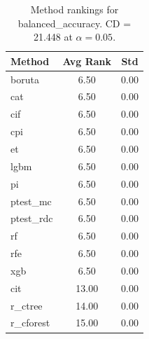 \begin{table}[h]
\centering
\caption{Method rankings for balanced_accuracy. CD = 21.448 at $\alpha=0.05$.}
\label{tab:ranks_balanced_accuracy}
\begin{tabular}{lcc}
\toprule
Method & Avg Rank & Std \\
\midrule
boruta & 6.50 & 0.00 \\
cat & 6.50 & 0.00 \\
cif & 6.50 & 0.00 \\
cpi & 6.50 & 0.00 \\
et & 6.50 & 0.00 \\
lgbm & 6.50 & 0.00 \\
pi & 6.50 & 0.00 \\
ptest_mc & 6.50 & 0.00 \\
ptest_rdc & 6.50 & 0.00 \\
rf & 6.50 & 0.00 \\
rfe & 6.50 & 0.00 \\
xgb & 6.50 & 0.00 \\
cit & 13.00 & 0.00 \\
r_ctree & 14.00 & 0.00 \\
r_cforest & 15.00 & 0.00 \\
\bottomrule
\end{tabular}
\end{table}